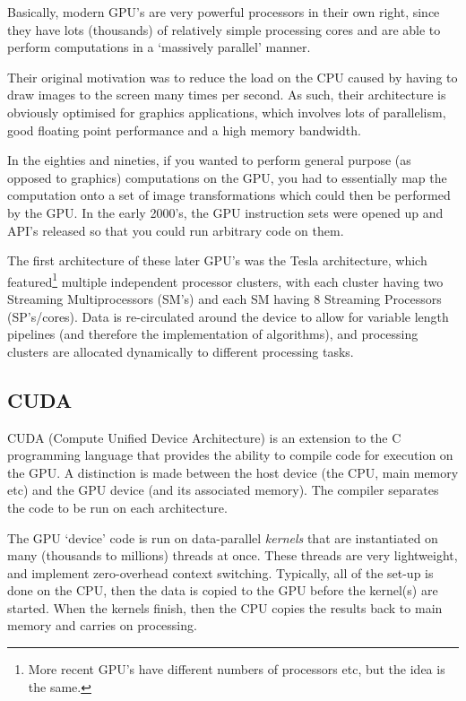 Basically, modern GPU's are very powerful processors in their own
right, since they have lots (thousands) of relatively simple
processing cores and are able to perform computations in a `massively
parallel' manner.

Their original motivation was to reduce the load on the CPU caused by
having to draw images to the screen many times per second. As such,
their architecture is obviously optimised for graphics applications,
which involves lots of parallelism, good floating point performance
and a high memory bandwidth.

In the eighties and nineties, if you wanted to perform general purpose
(as opposed to graphics) computations on the GPU, you had to
essentially map the computation onto a set of image transformations
which could then be performed by the GPU. In the early 2000's, the GPU
instruction sets were opened up and API's released so that you could
run arbitrary code on them.


The first architecture of these later GPU's was the Tesla
architecture, which featured\footnote{More recent GPU's have different
numbers of processors etc, but the idea is the same.} multiple
independent processor clusters, with each cluster having two Streaming
Multiprocessors (SM's) and each SM having 8 Streaming Processors
(SP's/cores). Data is re-circulated around the device to allow for
variable length pipelines (and therefore the implementation of
algorithms), and processing clusters are allocated dynamically to
different processing tasks.

\subsection{CUDA}

CUDA (Compute Unified Device Architecture) is an extension to the C
programming language that provides the ability to compile code for
execution on the GPU. A distinction is made between the host device
(the CPU, main memory etc) and the GPU device (and its associated
memory). The compiler separates the code to be run on each
architecture.

The GPU `device' code is run on data-parallel \textit{kernels} that
are instantiated on many (thousands to millions) threads at
once. These threads are very lightweight, and implement zero-overhead
context switching. Typically, all of the set-up is done on the CPU,
then the data is copied to the GPU before the kernel(s) are
started. When the kernels finish, then the CPU copies the results back
to main memory and carries on processing.

